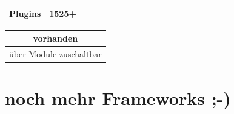 \documentclass[
    t,
    smaller,
    compress,
    xcolor=svgnames,            %
    table,
]{beamer}
\begin{document}
\begin{frame}
\begin{table}[h]
\begin{tabular}{|c|c|c|}
            Plugins       &  1525+ \cellcolor{dkgreen} & \\ \hline
         \end{tabular}
    \end{table}
         \begin{table}[h]
        \begin{tabular}{|c|}
            \hline
            \cellcolor{dkgreen} vorhanden  \\ \hline
            \cellcolor{yellow} über Module zuschaltbar \\ \hline
         \end{tabular}
    \end{table}
\end{frame}

\section{noch mehr Frameworks ;-)}

\end{document}
